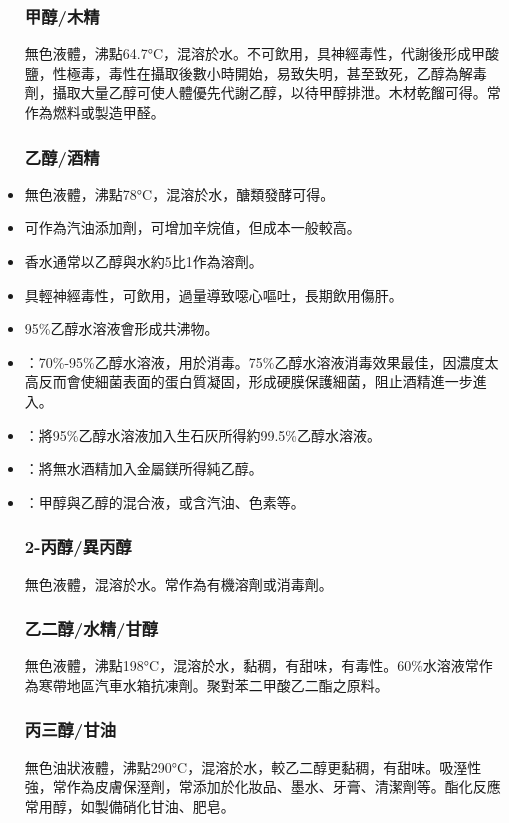 \documentclass[a4paper,12pt]{report}
\begin{document}
\begin{itemize}
\subsubsection{甲醇/木精}
無色液體，沸點64.7°C，混溶於水。不可飲用，具神經毒性，代謝後形成甲酸鹽，性極毒，毒性在攝取後數小時開始，易致失明，甚至致死，乙醇為解毒劑，攝取大量乙醇可使人體優先代謝乙醇，以待甲醇排泄。木材乾餾可得。常作為燃料或製造甲醛。
\subsubsection{乙醇/酒精}
\bit
\item 無色液體，沸點78°C，混溶於水，醣類發酵可得。
\item 可作為汽油添加劑，可增加辛烷值，但成本一般較高。
\item 香水通常以乙醇與水約5比1作為溶劑。
\item 具輕神經毒性，可飲用，過量導致噁心嘔吐，長期飲用傷肝。
\item 95\%乙醇水溶液會形成共沸物。
\item {}：70\%-95\%乙醇水溶液，用於消毒。75\%乙醇水溶液消毒效果最佳，因濃度太高反而會使細菌表面的蛋白質凝固，形成硬膜保護細菌，阻止酒精進一步進入。
\item {}：將95\%乙醇水溶液加入生石灰所得約99.5\%乙醇水溶液。
\item {}：將無水酒精加入金屬鎂所得純乙醇。
\item {}：甲醇與乙醇的混合液，或含汽油、色素等。
\eit
\subsubsection{2-丙醇/異丙醇}
無色液體，混溶於水。常作為有機溶劑或消毒劑。
\subsubsection{乙二醇/水精/甘醇}
無色液體，沸點198°C，混溶於水，黏稠，有甜味，有毒性。60\%水溶液常作為寒帶地區汽車水箱抗凍劑。聚對苯二甲酸乙二酯之原料。
\subsubsection{丙三醇/甘油}
無色油狀液體，沸點290°C，混溶於水，較乙二醇更黏稠，有甜味。吸溼性強，常作為皮膚保溼劑，常添加於化妝品、墨水、牙膏、清潔劑等。酯化反應常用醇，如製備硝化甘油、肥皂。

\end{itemize}
\end{document}
